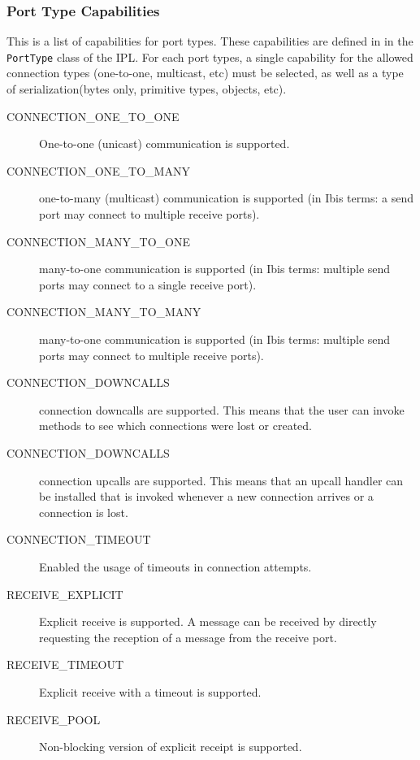 \documentclass[10pt]{article}
\begin{document}
\subsubsection{Port Type Capabilities}

This is a list of capabilities for port types. These capabilities are
defined in in the \texttt{PortType} class of the IPL.  For each port
types, a single capability for the allowed connection types (one-to-one,
multicast, etc) must be selected, as well as a type of
serialization(bytes only, primitive types, objects, etc). 

\begin{description}
\item[CONNECTION\_ONE\_TO\_ONE]
One-to-one (unicast) communication is supported.

\item[CONNECTION\_ONE\_TO\_MANY]
one-to-many (multicast) communication is supported
(in Ibis terms: a send port
may connect to multiple receive ports).

\item[CONNECTION\_MANY\_TO\_ONE]
many-to-one communication is supported (in Ibis terms: multiple
send ports may connect to a single receive port).

\item[CONNECTION\_MANY\_TO\_MANY]
many-to-one communication is supported (in Ibis terms: multiple
send ports may connect to multiple receive ports).

\item[CONNECTION\_DOWNCALLS]
connection downcalls are supported. This means that the user can
invoke methods to see which connections were lost or created.

\item[CONNECTION\_DOWNCALLS]
connection upcalls are supported. This means that an upcall handler can
be installed that is invoked whenever a new connection arrives or a
connection is lost.

\item[CONNECTION\_TIMEOUT]
Enabled the usage of timeouts in connection attempts.

\item[RECEIVE\_EXPLICIT]
Explicit receive is supported. A message can be received by directly
requesting the reception of a message from the receive port.

\item[RECEIVE\_TIMEOUT]
Explicit receive with a timeout is supported.

\item[RECEIVE\_POOL]
Non-blocking version of explicit receipt is supported.


\end{description}
\end{document}
